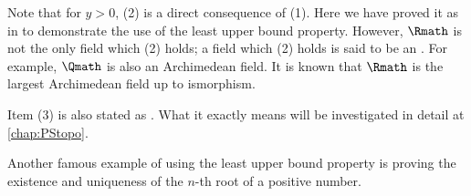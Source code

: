 Note that for \(y>0\), (2) is a direct consequence of (1).
Here we have proved it as in \cite{PMA}
to demonstrate the use of the least upper bound property.
However, \(\Rmath\) is not the only field which (2) holds;
a field which (2) holds is said to be
an .
For example, \(\Qmath\) is also an Archimedean field.
It is known that
\(\Rmath\) is the largest Archimedean field up to ismorphism.

Item (3) is also stated as
.
What it exactly means will be investigated in detail
at \cref{chap:PStopo}.

Another famous example of using the least upper bound property
is proving the existence and uniqueness of
the \(n\)-th root of a positive number.

